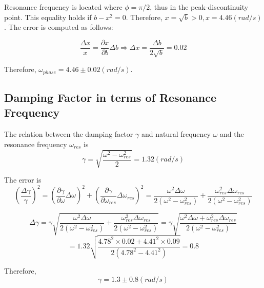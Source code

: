 Resonance frequency is located where $\phi = \pi/2$, thus in the peak-discontinuity point. This equality holds if $b-x^2=0$. Therefore, $x = \sqrt{b} > 0, x = 4.46 (rad/s)$. The error is computed as follows:

\begin{equation*}
  \frac{\Delta x}{x} = \frac{\partial x}{\partial b} \Delta b \Rightarrow \Delta x = \frac{\Delta b}{2\sqrt{b}} = 0.02
\end{equation*}

Therefore, $\omega_{phase} = 4.46 \pm 0.02 (rad/s)$.

\subsection{Damping Factor in terms of Resonance Frequency}

The relation between the damping factor $\gamma$ and natural frequency $\omega$ and the resonance frequency $\omega_{res}$ is
\begin{equation*}
  \gamma = \sqrt{\frac{\omega^2 - \omega_{res}^2}{2}} = 1.32 (rad/s)
\end{equation*}

The error is
\begin{equation*}
  \left( \frac{\Delta \gamma}{\gamma} \right)^2 = \left( \frac{\partial \gamma}{\partial \omega} \Delta \omega \right)^2 + \left( \frac{\partial \gamma}{\partial \omega_{res}} \Delta {\omega_{res}} \right)^2 = \frac{\omega^2 \Delta {\omega}}{2(\omega^2 - \omega_{res}^2)} + \frac{\omega_{res}^2\Delta {\omega_{res}}}{2(\omega^2 - \omega_{res}^2)}
\end{equation*}

\begin{equation*}
  \Delta \gamma = \gamma \sqrt{\frac{\omega^2 \Delta {\omega}}{2(\omega^2 - \omega_{res}^2)} + \frac{\omega_{res}^2\Delta {\omega_{res}}}{2(\omega^2 - \omega_{res}^2)}} = \gamma \sqrt{\frac{\omega^2 \Delta \omega + \omega_{res}^2 \Delta {\omega_{res}}}{2(\omega^2 - \omega_{res}^2)}}
\end{equation*}
\begin{equation*}
  = 1.32 \sqrt{ \frac{4.78^2 \times 0.02 + 4.41^2 \times 0.09}{2(4.78^2 - 4.41^2)} } = 0.8
\end{equation*}

Therefore,
\begin{equation*}
  \gamma = 1.3\pm 0.8 (rad/s) 
\end{equation*}
